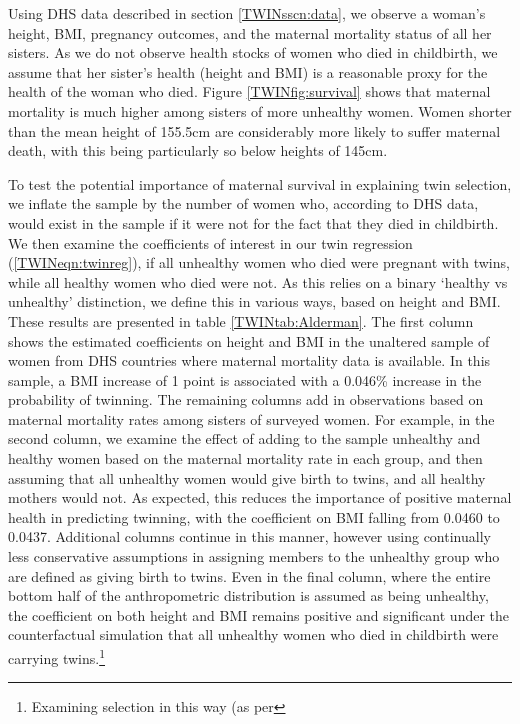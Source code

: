 \documentclass[subeqn]{article}
\begin{document}
\begin{spacing}{1.4}
Using DHS data described in section \ref{TWINsscn:data}, we observe a woman's
height, BMI, pregnancy outcomes, and the maternal mortality status of all her
sisters.  As we do not observe health stocks of women who died in childbirth,
we assume that her sister's health (height and BMI) is a reasonable proxy for
the health of the woman who died.  Figure \ref{TWINfig:survival} shows that
maternal mortality is much higher among sisters of more unhealthy women.
Women shorter than the mean height of 155.5cm are considerably more likely to
suffer maternal death, with this being particularly so below heights of 145cm.

To test the potential importance of maternal survival in explaining twin 
selection, we inflate the sample by the number of women who, according to 
DHS data, would exist in the sample if it were not for the fact that they died
in childbirth.  We then examine the coefficients of interest in our twin 
regression (\ref{TWINeqn:twinreg}), if all unhealthy women who died were 
pregnant with twins, while all healthy women who died were not.  As this relies 
on a binary `healthy vs unhealthy' distinction, we define this in various ways, 
based on height and BMI.  These results are presented in table 
\ref{TWINtab:Alderman}.  The first column shows the estimated coefficients on 
height and BMI in the unaltered sample of women from DHS countries where 
maternal mortality data is available.  In this sample, a BMI increase of 1 
point is associated with a 0.046\% increase in the probability of twinning. The 
remaining columns add in observations based on maternal mortality rates among 
sisters of surveyed women.  For example, in the second column, we examine the 
effect of adding to the sample unhealthy and healthy women based on the
maternal mortality rate in each group, and then assuming that all unhealthy
women would give birth to twins, and all healthy mothers would not. As
expected, this reduces the importance of positive maternal health in predicting
twinning, with the coefficient on BMI falling from 0.0460 to 0.0437. Additional
columns continue in this manner, however using continually less conservative
assumptions in assigning members to the unhealthy group who are defined as
giving birth to twins. Even in the final column, where the entire bottom half
of the anthropometric distribution is assumed as being unhealthy, the
coefficient on both height and BMI remains positive and significant under the
counterfactual simulation that all unhealthy women who died in childbirth were
carrying twins.\footnote{Examining selection in this way (as per
}
\end{spacing}
\end{document}
